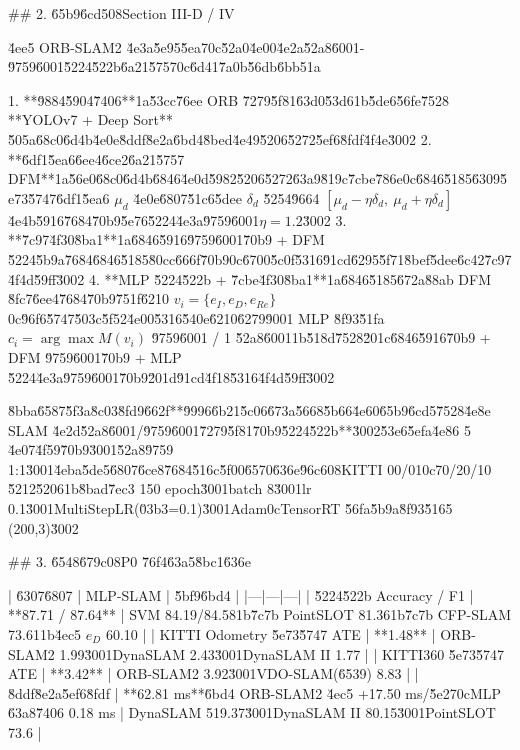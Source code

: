\documentclass[10pt]{article}
\begin{document}
\begin{AnswerText}
## 2. \u65b9\u6cd5\uff08Section III-D / IV

\u4ee5 ORB-SLAM2 \u4e3a\u5e95\u5ea7\uff0c\u52a0\u4e00\u4e2a\u52a8\u6001-\u9759\u6001\u5224\u522b\u6a21\u5757\uff0c\u6d41\u7a0b\u56db\u6bb5\uff1a

1. **\u9884\u5904\u7406**\uff1a\u53cc\u76ee ORB \u7279\u5f81\u63d0\u53d6\uff1b\u5de6\u56fe\u7528 **YOLOv7 + Deep Sort** \u505a\u68c0\u6d4b\u4e0e\u8ddf\u8e2a\u6bd4\u8bed\u4e49\u5206\u5272\u5ef6\u8fdf\u4f4e\u3002
2. **\u6df1\u5ea6\u6ee4\u6ce2\u6a21\u5757 DFM**\uff1a\u56e0\u68c0\u6d4b\u6846\u4e0d\u5982\u5206\u5272\u63a9\u819c\u7cbe\u786e\uff0c\u6846\u5185\u6309\u5e73\u5747\u6df1\u5ea6 $\mu_d$ \u4e0e\u6807\u51c6\u5dee $\delta_d$ \u5254\u9664 $[\mu_d-\eta\delta_d,\ \mu_d+\eta\delta_d]$ \u4e4b\u5916\u7684\u70b9\u5e76\u5224\u4e3a\u9759\u6001$\eta=1.2$\u3002
3. **\u7c97\u4f30\u8ba1**\uff1a\u6846\u5916\u9759\u6001\u70b9 + DFM \u5224\u5b9a\u7684\u6846\u5185\u80cc\u666f\u70b9\uff0c\u6700\u5c0f\u5316\u91cd\u6295\u5f71\u8bef\u5dee\u6c42\u7c97\u4f4d\u59ff\u3002
4. **MLP \u5224\u522b + \u7cbe\u4f30\u8ba1**\uff1a\u6846\u5185\u672a\u88ab DFM \u8fc7\u6ee4\u7684\u70b9\u751f\u6210 $v_i=\{e_I,e_D,e_{Re}\}$\uff0c\u96f6\u5747\u503c\u5f52\u4e00\u5316\u540e\u6210\u6279\u9001 MLP \u8f93\u51fa $c_i=\arg\max M(v_i)$ \u9759\u6001 / 1 \u52a8\u6001\uff1b\u518d\u7528\u201c\u6846\u5916\u70b9 + DFM \u9759\u6001\u70b9 + MLP \u5224\u4e3a\u9759\u6001\u70b9\u201d\u91cd\u4f18\u5316\u4f4d\u59ff\u3002

\u8bba\u6587\u5f3a\u8c03\u8fd9\u662f**\u9996\u6b21\u5c06\u673a\u5668\u5b66\u4e60\u65b9\u6cd5\u7528\u4e8e SLAM \u4e2d\u52a8\u6001/\u9759\u6001\u7279\u5f81\u70b9\u5224\u522b**\u3002\u53e6\u5efa\u4e86 5 \u4e07\u4f59\u70b9\u3001\u52a8\u9759 1:1\u3001\u4eba\u5de5\u6807\u6ce8\u7684\u516c\u5f00\u6570\u636e\u96c6\uff08KITTI 00/01\uff0c70/20/10 \u5212\u5206\uff1b\u8bad\u7ec3 150 epoch\u3001batch 8\u3001lr 0.1\u3001MultiStepLR(\u03b3=0.1)\u3001Adam\uff0cTensorRT \u56fa\u5b9a\u8f93\u5165 (200,3)\u3002

## 3. \u6548\u679c\uff08P0 \u76f4\u63a5\u8bc1\u636e

| \u6307\u6807 | MLP-SLAM | \u5bf9\u6bd4 |
|---|---|---|
| \u5224\u522b Accuracy / F1 | **87.71 / 87.64** | SVM 84.19/84.58\uff1b\u7c7b PointSLOT 81.36\uff1b\u7c7b CFP-SLAM 73.61\uff1b\u4ec5 $e_D$ 60.10 |
| KITTI Odometry \u5e73\u5747 ATE | **1.48** | ORB-SLAM2 1.99\u3001DynaSLAM 2.43\u3001DynaSLAM II 1.77 |
| KITTI360 \u5e73\u5747 ATE | **3.42** | ORB-SLAM2 3.92\u3001VDO-SLAM(\u6539) 8.83 |
| \u8ddf\u8e2a\u5ef6\u8fdf | **62.81 ms**\u6bd4 ORB-SLAM2 \u4ec5 +17.50 ms/\u5e27\uff0cMLP \u63a8\u7406 0.18 ms | DynaSLAM 519.37\u3001DynaSLAM II 80.15\u3001PointSLOT 73.6 |


\end{AnswerText}
\end{document}
